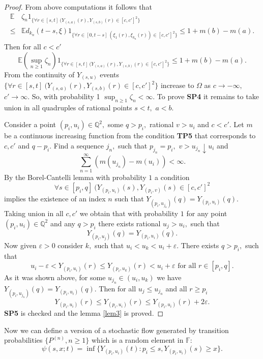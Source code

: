 \documentclass[a4paper,12pt]{article}
\newcommand{\1}{1\!\!\,{\rm I}}
\theoremstyle{plain}
\begin{document}
\begin{proof}
	From above computations it follows that 
	$$
	\begin{aligned}
	\mathbb{E}&  \zeta_n 1_{\{\forall r\in[s,t] \ (Y_{(s,a)}(r),Y_{(s,b)}(r)\in [c,c']^2\}} \\
	\leq & \mathbb{E} d_{k_n}(t-s,\xi)1_{\{\forall r\in[0,t-s] \ (\xi_1 (r), \xi_{k_n}(r))\in[c,c']^2\}}\leq 1+m(b)-m(a).
	\end{aligned}
	$$
	Then for all $c<c'$
	$$
	\mathbb{E} (\sup_{n\geq 1}\zeta_n) 1_{\{\forall r\in[s,t] \ (Y_{(s,a)}(r),Y_{(s,b)}(r)\in [c,c']^2\}}\leq 1+m(b)-m(a).
	$$
	From the continuity of $Y_{(s,u)}$ events $\{\forall r\in[s,t] \ (Y_{(s,a)}(r),Y_{(s,b)}(r)\in [c,c']^2\}$ increase to $\Omega$ as $c\to-\infty,$ $c'\to \infty.$ So, with probability 1 $	\sup_{n\geq 1}\zeta_n <\infty.$ 
	To prove {\bf SP4} it remains to take union in all quadruples of rational points $s<t,$ $a<b.$
	
	Consider a point $(p_i,u_i)\in \mathbb{Q}^2,$ some $q>p_i,$ rational $v>u_i$ and $c<c'.$ Let $m$ be a continuous increasing function from the condition {\bf TP5} that corresponds to $c,c'$ and $q-p_i.$ Find a sequence ${j_n},$ such that $p_{j_n}=p_i,$  $v>u_{j_n}\downarrow u_i$ and
	$$
	\sum^\infty_{n=1} (m(u_{j_n})-m(u_i))<\infty.
	$$
	By the Borel-Cantelli lemma with probability $1$ a condition 
	$$
	\forall s\in[p_i,q] \  (Y_{(p_i,u_i)}(s),Y_{(p_i,v)}(s)\in [c,c']^2
	$$
	implies the existence of an index $n$  such that $Y_{(p_i,u_{j_n})}(q)=Y_{(p_i,u_i)}(q).$ 	Taking union in all $c,c'$ we obtain that with probability $1$ for any point $(p_i,u_i)\in \mathbb{Q}^2$ and any $q>p_i$ there exists rational $u_j>u_i,$ such that 
	$$
	Y_{(p_i,u_{j})}(q)=Y_{(p_i,u_i)}(q).
	$$
	Now  given $\varepsilon>0$ consider $k,$ such that  $u_i<u_{k}<u_i+\varepsilon.$ There exists $q>p_i,$ such that 
	$$
	u_i-\varepsilon<Y_{(p_i,u_i)}(r)\leq Y_{(p_i,u_k)}(r)<u_i+\varepsilon \mbox{ for all } r\in [p_i, q].
	$$
	As it was shown above, for some $u_{j_n}\in (u_i,u_k)$ we have $	Y_{(p_i,u_{j_n})}(q)=Y_{(p_i,u_i)}(q).$ Then for all $u_j\leq u_{j_n}$ and all $r\geq p_i$
	$$
	Y_{(p_i,u_i)}(r)\leq Y_{(p_i,u_i)}(r)\leq Y_{(p_i,u_i)}(r)+2\varepsilon.
	$$
	{\bf SP5} is checked and the lemma \ref{lem3} is proved.
	
\end{proof}

Now we can define a version of a stochastic flow generated by transition probabilities $\{P^{(n)},n\geq 1\}$ which is a random element in $\mathbb{F}:$
$$
\psi(s,x;t)=\inf\{Y_{(p_i,u_i)}(t):p_i\leq s, Y_{(p_i,u_i)}(s)\geq x\}.
$$ 
\end{document}
